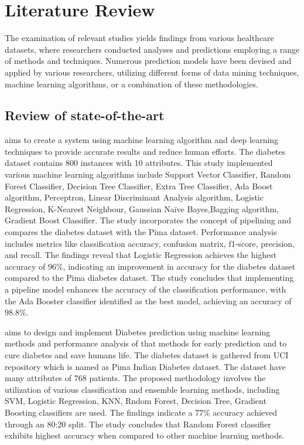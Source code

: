 \chapter{Literature Review}
\label{ch:lit_rev} %
The examination of relevant studies yields findings from various healthcare datasets, where researchers conducted analyses and predictions employing a range of methods and techniques. Numerous prediction models have been devised and applied by various researchers, utilizing different forms of data mining techniques, machine learning algorithms, or a combination of these methodologies.
\section{Review of state-of-the-art} 
\cite{mujumdar2019diabetes} aims to create a system using machine learning algorithm and deep learning techniques to provide accurate results and reduce human efforts. The diabetes dataset contains 800 instances with 10 attributes. This study implemented various machine learning algorithms include Support Vector Classifier, Random Forest Classifier, Decision Tree Classifier, Extra Tree Classifier, Ada Boost algorithm, Perceptron, Linear Discriminant Analysis algorithm, Logistic Regression, K-Nearest Neighbour, Gaussian Naïve Bayes,Bagging algorithm, Gradient Boost Classifier. The study incorporates the concept of pipelining and compares the diabetes dataset with the Pima dataset. Performance analysis includes metrics like classification accuracy, confusion matrix, f1-score, precision, and recall. The findings reveal that Logistic Regression achieves the highest accuracy of 96\%, indicating an improvement in accuracy for the diabetes dataset compared to the Pima diabetes dataset. The study concludes that implementing a pipeline model enhances the accuracy of the classification performance, with the Ada Booster classifier identified as the best model, achieving an accuracy of 98.8\%.

\cite{soni2020diabetes} aims to design and implement Diabetes prediction using machine learning methods and performance analysis of that methods for early prediction and to cure diabetes and save humans life. The diabetes dataset is gathered from  UCI repository which is named as Pima Indian Diabetes dataset. The dataset have many attributes of 768 patients. The proposed methodology involves the utilization of various classification and ensemble learning methods, including SVM, Logistic Regression, KNN, Rndom Forest, Decision Tree, Gradient Boosting classifiers are used. The findings indicate a 77\% accuracy achieved through an 80:20 split. The study concludes that Random Forest classifier exhibits highest accuracy when compared to other machine learning methods.

